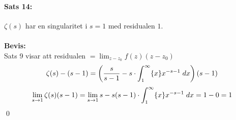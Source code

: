 \paragraph{Sats 14:} $\zeta(s)$ har en singularitet i $s = 1$ med residualen $1$.\\
\\
{\bf Bevis:}\\
Sats 9 visar att residualen $= \lim_{z - z_0} f(z)(z - z_0)$
\[
	\zeta(s) - (s - 1) = \left (
		\frac {s} {s - 1} - s \cdot \int_1^\infty \{x\} x^{-s - 1} \; dx 
		\right )
	(s - 1)
\]
\[
	\lim_{s \to 1} \zeta(s)(s - 1) = \lim_{s \to 1} s - s (s - 1) \cdot \int_1^\infty \{x\} x^{-s - 1} \; dx =
		1 - 0 = 1
\]
\hfill \qed




